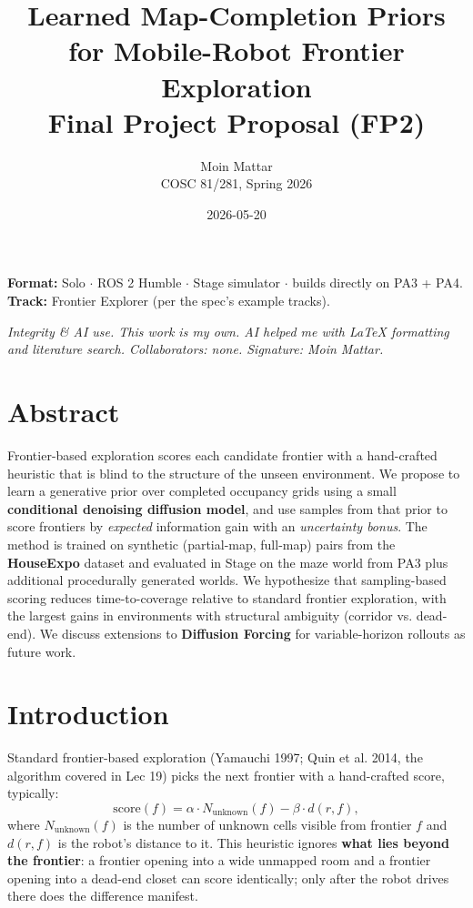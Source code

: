 \documentclass[11pt]{article}
\title{\textbf{Learned Map-Completion Priors for Mobile-Robot Frontier Exploration}\\
\large Final Project Proposal (FP2)}
\author{Moin Mattar \\ COSC 81/281, Spring 2026}
\date{2026-05-20}
\begin{document}
\maketitle
\thispagestyle{fancy}

\noindent\textbf{Format:} Solo $\cdot$ ROS 2 Humble $\cdot$ Stage simulator $\cdot$ builds directly on PA3 + PA4.\\
\textbf{Track:} Frontier Explorer (per the spec's example tracks).

\textit{Integrity \& AI use. This work is my own. AI helped me with LaTeX formatting and literature search. Collaborators: none. Signature: Moin Mattar.}

\section*{Abstract}
Frontier-based exploration scores each candidate frontier with a hand-crafted heuristic that is blind to the structure of the unseen environment. We propose to learn a generative prior over completed occupancy grids using a small \textbf{conditional denoising diffusion model}, and use samples from that prior to score frontiers by \emph{expected} information gain with an \emph{uncertainty bonus}. The method is trained on synthetic (partial-map, full-map) pairs from the \textbf{HouseExpo} dataset and evaluated in Stage on the maze world from PA3 plus additional procedurally generated worlds. We hypothesize that sampling-based scoring reduces time-to-coverage relative to standard frontier exploration, with the largest gains in environments with structural ambiguity (corridor vs. dead-end). We discuss extensions to \textbf{Diffusion Forcing} for variable-horizon rollouts as future work.

\section{Introduction}

Standard frontier-based exploration (Yamauchi 1997; Quin et al. 2014, the algorithm covered in Lec 19) picks the next frontier with a hand-crafted score, typically:
\[
\text{score}(f) = \alpha \cdot N_\text{unknown}(f) - \beta \cdot d(r, f),
\]
where $N_\text{unknown}(f)$ is the number of unknown cells visible from frontier $f$ and $d(r,f)$ is the robot's distance to it. This heuristic ignores \textbf{what lies beyond the frontier}: a frontier opening into a wide unmapped room and a frontier opening into a dead-end closet can score identically; only after the robot drives there does the difference manifest.
\end{document}
